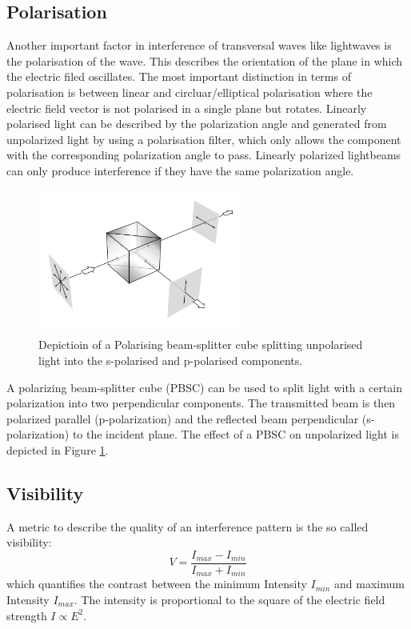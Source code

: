 \subsection{Polarisation}
Another important factor in interference of transversal waves like lightwaves is the polarisation of the wave. This describes the orientation of the plane in which the electric filed oscillates. The most important distinction in terms of polarisation is between linear and circluar/elliptical polarisation where the electric field vector is not polarised in a single plane but rotates. Linearly polarised light can be described by the polarization angle and generated from unpolarized light by using a polarisation filter, which only allows the component with the corresponding polarization angle to pass. Linearly polarized lightbeams can only produce interference if they have the same polarization angle. 
\begin{figure}
\centering
\includegraphics[width=0.6\textwidth]{PBSC}
\caption{Depictioin of a Polarising beam-splitter cube splitting unpolarised light into the s-polarised and p-polarised components. \cite{Hecht_2018}}
\label{fig:PBSC}
\end{figure}
A polarizing beam-splitter cube (PBSC) can be used to split light with a certain polarization into two perpendicular components. The transmitted beam is then polarized parallel (p-polarization) and the reflected beam perpendicular (s-polarization) to the incident plane. The effect of a PBSC on unpolarized light is depicted in Figure \ref{fig:PBSC}.
\subsection{Visibility}
A metric to describe the quality of an interference pattern is the so called visibility:
\begin{equation}
    V=\frac{I_{max}-I_{min}}{I_{max}+I_{min}}
    \label{eq:K}
\end{equation}
which quantifies the contrast between the minimum Intensity $I_{min}$ and maximum Intensity $I_{max}$. The intensity is proportional to the square of the electric field strength $I\propto E^2$. 

